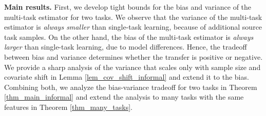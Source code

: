 \textbf{Main results.} First, we develop tight bounds for the bias and variance of the multi-task estimator for two tasks.
We observe that the variance of the multi-task estimator is \textit{always smaller} than single-task learning, because of additional source task samples.
On the other hand, the bias of the multi-task estimator is \textit{always larger} than single-task learning, due to model differences.
Hence, the tradeoff between bias and variance determines whether the transfer is positive or negative.
We provide a sharp analysis of the variance that scales only with sample size and covariate shift in Lemma \ref{lem_cov_shift_informal} and extend it to the bias.
Combining both, we analyze the bias-variance tradeoff for two tasks in Theorem \ref{thm_main_informal} and extend the analysis to many tasks with the same features in Theorem \ref{thm_many_tasks}.


